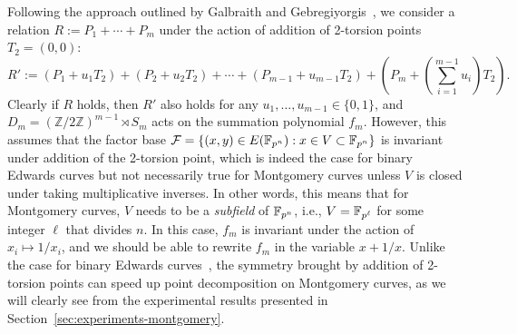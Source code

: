 Following the approach outlined by Galbraith and
Gebregiyorgis~\cite{DBLP:conf/indocrypt/GalbraithG14}, we consider a
relation $R:=P_1+\cdots+P_m$ under the action of addition of 2-torsion
points $T_2=(0,0)$:
\[ R' :=
  (P_1+u_1T_2)+(P_2+u_2T_2)+\cdots+(P_{m-1}+u_{m-1}T_2)+\left(P_m+\left(\sum_{i=1}^{m-1}u_i\right)T_2\right). \]
%
Clearly if $R$ holds, then $R'$ also holds for any
$u_1,\ldots,u_{m-1}\in\{0,1\}$, and
$D_m=(\mathbb{Z}/2\mathbb{Z})^{m-1}\rtimes S_m$ acts on the summation
polynomial $f_m$.
%
However, this assumes that the factor base
$\mathcal F=\{(x,y)\in E(\mathbb F_{p^n}):x\in V\subset\mathbb F_{p^n}\}$ is invariant
under addition of the 2-torsion point, which is indeed the case for
binary Edwards curves but not necessarily true for Montgomery curves
unless $V$ is closed under taking multiplicative inverses.
%
In other words, this means that for Montgomery curves, $V$ needs to be
a \emph{subfield} of $\mathbb F_{p^n}$, i.e., $V=\mathbb F_{p^\ell}$ for some integer
$\ell$ that divides $n$.
%
In this case, $f_m$ is invariant under the action of
$x_i\mapsto 1/x_i$, and we should be able to rewrite $f_m$ in the
variable $x+1/x$.
%
Unlike the case for binary Edwards
curves~\cite{DBLP:conf/indocrypt/GalbraithG14}, the symmetry brought
by addition of 2-torsion points can speed up point decomposition on
Montgomery curves, as we will clearly see from the experimental
results presented in Section~\ref{sec:experiments-montgomery}.

